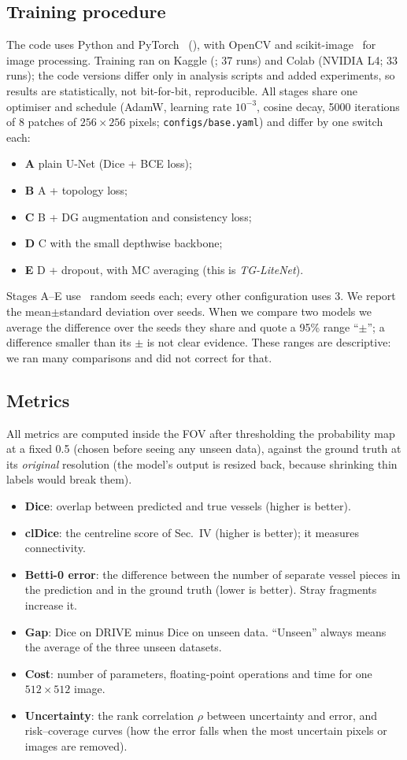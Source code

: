 \documentclass[conference]{IEEEtran}
\begin{document}
\subsection{Training procedure}
The code uses Python and PyTorch~\cite{paszke2019} (\hwTorch), with OpenCV and scikit-image~\cite{vanderwalt2014} for image processing. Training ran on Kaggle (\hwGPU; 37 runs) and Colab (NVIDIA L4; 33 runs); the code versions differ only in analysis scripts and added experiments, so results are statistically, not bit-for-bit, reproducible. All stages share one optimiser and schedule (AdamW, learning rate $10^{-3}$, cosine decay, 5000 iterations of 8 patches of $256{\times}256$ pixels; \texttt{configs/base.yaml}) and differ by one switch each:
\begin{itemize}
\item \textbf{A} plain U-Net (Dice + BCE loss);
\item \textbf{B} A + topology loss;
\item \textbf{C} B + DG augmentation and consistency loss;
\item \textbf{D} C with the small depthwise backbone;
\item \textbf{E} D + dropout, with MC averaging (this is \emph{TG-LiteNet}).
\end{itemize}
Stages A--E use \nSeeds\ random seeds each; every other configuration uses 3. We report the mean$\pm$standard deviation over seeds. When we compare two models we average the difference over the seeds they share and quote a 95\% range ``$\pm$''; a difference smaller than its $\pm$ is not clear evidence. These ranges are descriptive: we ran many comparisons and did not correct for that.

\subsection{Metrics}
All metrics are computed inside the FOV after thresholding the probability map at a fixed 0.5 (chosen before seeing any unseen data), against the ground truth at its \emph{original} resolution (the model's output is resized back, because shrinking thin labels would break them).
\begin{itemize}
\item \textbf{Dice}: overlap between predicted and true vessels (higher is better).
\item \textbf{clDice}: the centreline score of Sec.~IV (higher is better); it measures connectivity.
\item \textbf{Betti-0 error}: the difference between the number of separate vessel pieces in the prediction and in the ground truth (lower is better). Stray fragments increase it.
\item \textbf{Gap}: Dice on DRIVE minus Dice on unseen data. ``Unseen'' always means the average of the three unseen datasets.
\item \textbf{Cost}: number of parameters, floating-point operations and time for one $512{\times}512$ image.
\item \textbf{Uncertainty}: the rank correlation $\rho$ between uncertainty and error, and risk--coverage curves (how the error falls when the most uncertain pixels or images are removed).
\end{itemize}
\end{document}
